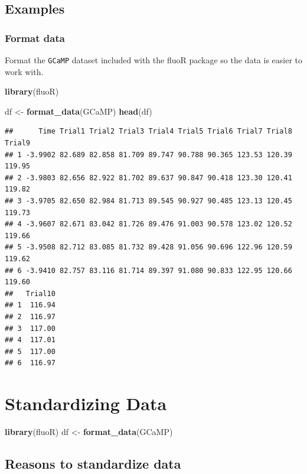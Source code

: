 \documentclass[
]{book}
\newenvironment{Shaded}{\begin{snugshade}}{\end{snugshade}}
\newcommand{\KeywordTok}[1]{\textcolor[rgb]{0.13,0.29,0.53}{\textbf{#1}}}
\newcommand{\NormalTok}[1]{#1}
\newcommand{\StringTok}[1]{\textcolor[rgb]{0.31,0.60,0.02}{#1}}
\begin{document}
\hypertarget{intro-examples}{%
\section{Examples}\label{intro-examples}}

\hypertarget{intro-formatdata}{%
\subsection{Format data}\label{intro-formatdata}}

Format the \texttt{GCaMP} dataset included with the fluoR package so the data is easier to work with.

\begin{Shaded}
\begin{Highlighting}[]
\KeywordTok{library}\NormalTok{(fluoR)}

\NormalTok{df <-}\StringTok{ }\KeywordTok{format_data}\NormalTok{(GCaMP)}
\KeywordTok{head}\NormalTok{(df)}
\end{Highlighting}
\end{Shaded}

\begin{verbatim}
##      Time Trial1 Trial2 Trial3 Trial4 Trial5 Trial6 Trial7 Trial8 Trial9
## 1 -3.9902 82.689 82.858 81.709 89.747 90.788 90.365 123.53 120.39 119.95
## 2 -3.9803 82.656 82.922 81.702 89.637 90.847 90.418 123.30 120.41 119.82
## 3 -3.9705 82.650 82.984 81.713 89.545 90.927 90.485 123.13 120.45 119.73
## 4 -3.9607 82.671 83.042 81.726 89.476 91.003 90.578 123.02 120.52 119.66
## 5 -3.9508 82.712 83.085 81.732 89.428 91.056 90.696 122.96 120.59 119.62
## 6 -3.9410 82.757 83.116 81.714 89.397 91.080 90.833 122.95 120.66 119.60
##   Trial10
## 1  116.94
## 2  116.97
## 3  117.00
## 4  117.01
## 5  117.00
## 6  116.97
\end{verbatim}

\hypertarget{stand}{%
\chapter{Standardizing Data}\label{stand}}

\begin{Shaded}
\begin{Highlighting}[]
\KeywordTok{library}\NormalTok{(fluoR)}
\NormalTok{df <-}\StringTok{ }\KeywordTok{format_data}\NormalTok{(GCaMP)}
\end{Highlighting}
\end{Shaded}

\hypertarget{stand-reasons}{%
\section{Reasons to standardize data}\label{stand-reasons}}
\end{document}
